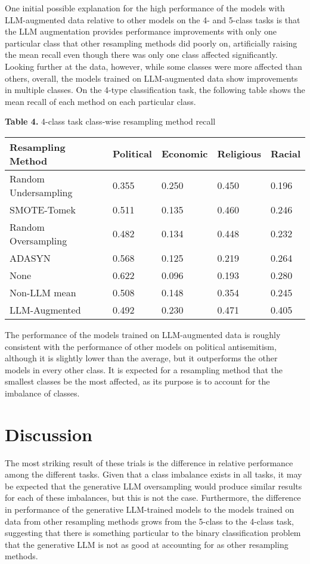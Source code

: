 \documentclass[runningheads]{llncs}
\newenvironment{nscenter}
 {\parskip=0pt\par\nopagebreak\centering}
 {\par\noindent\ignorespacesafterend}
\begin{document}
One initial possible explanation for the high performance of the models with LLM-augmented data relative to other models on the 4- and 5-class tasks is that the LLM augmentation provides performance improvements with only one particular class that other resampling methods did poorly on, artificially raising the mean recall even though there was only one class affected significantly. Looking further at the data, however, while some classes were more affected than others, overall, the models trained on LLM-augmented data show improvements in multiple classes. On the 4-type classification task, the following table shows the mean recall of each method on each particular class.
\begin{nscenter}
{\bf Table 4.} 4-class task class-wise resampling method recall\\

\begin{tabular}{|l|l|l|l|l|}
\hline
Resampling Method & Political & Economic & Religious & Racial \\\hline
Random Undersampling & 0.355 & 0.250 & 0.450 & 0.196  \\\hline
SMOTE-Tomek & 0.511 & 0.135 & 0.460 & 0.246 \\\hline
Random Oversampling & 0.482 & 0.134 & 0.448 & 0.232  \\\hline
ADASYN & 0.568 & 0.125 & 0.219 & 0.264 \\\hline
None & 0.622 & 0.096 & 0.193 & 0.280  \\\hline
Non-LLM mean & 0.508 & 0.148 & 0.354 & 0.245 \\\hline
LLM-Augmented & 0.492 & 0.230 & 0.471 & 0.405  \\\hline
\end{tabular}
\end{nscenter}
The performance of the models trained on LLM-augmented data is roughly consistent with the performance of other models on political antisemitism, although it is slightly lower than the average, but it outperforms the other models in every other class. It is expected for a resampling method that the smallest classes be the most affected, as its purpose is to account for the imbalance of classes.

\section{Discussion}
The most striking result of these trials is the difference in relative performance among the different tasks. Given that a class imbalance exists in all tasks, it may be expected that the generative LLM oversampling would produce similar results for each of these imbalances, but this is not the case. Furthermore, the difference in performance of the generative LLM-trained models to the models trained on data from other resampling methods grows from the 5-class to the 4-class task, suggesting that there is something particular to the binary classification problem that the generative LLM is not as good at accounting for as other resampling methods.
\end{document}

